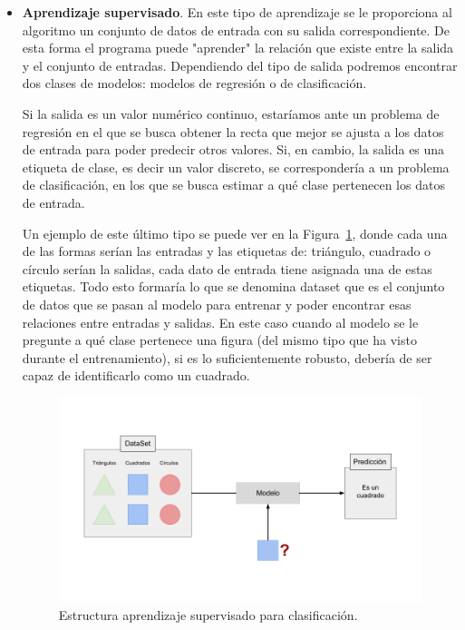 \documentclass[a4paper, 12pt]{book}
\begin{document}
\begin{itemize}
    \item \textbf{Aprendizaje supervisado}. En este tipo de aprendizaje se le proporciona al algoritmo un conjunto de datos de entrada con su salida correspondiente. De esta forma el programa puede "aprender" la relación que existe entre la salida y el conjunto de entradas. Dependiendo del tipo de salida podremos encontrar dos clases de modelos: modelos de regresión o de clasificación.
    
    Si la salida es un valor numérico continuo, estaríamos ante un problema de regresión en el que se busca obtener la recta que mejor se ajusta a los datos de entrada para poder predecir otros valores. Si, en cambio, la salida es una etiqueta de clase, es decir un valor discreto, se correspondería a un problema de clasificación, en los que se busca estimar a qué clase pertenecen los datos de entrada. 
    
    Un ejemplo de este último tipo se puede ver en la Figura~\ref{fig:a_supervisado}, donde cada una de las formas serían las entradas y las etiquetas de: triángulo, cuadrado o círculo serían la salidas, cada dato de entrada tiene asignada una de estas etiquetas. Todo esto formaría lo que se denomina dataset que es el conjunto de datos que se pasan al modelo para entrenar y poder encontrar esas relaciones entre entradas y salidas. En este caso cuando al modelo se le pregunte a qué clase pertenece una figura (del mismo tipo que ha visto durante el entrenamiento), si es lo suficientemente robusto, debería de ser capaz de identificarlo como un cuadrado.
    
    \begin{figure}[]
      \centering
      \includegraphics[width=12cm, keepaspectratio]{img/a_supervisado.png}
      \caption{Estructura aprendizaje supervisado para clasificación.}\label{fig:a_supervisado}
    \end{figure}
    

\end{itemize}
\end{document}
